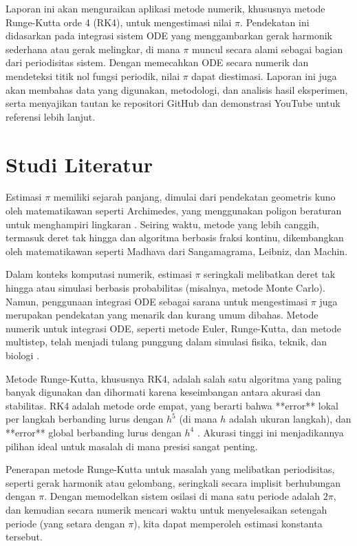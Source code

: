 \documentclass[conference]{IEEEtran}
\begin{document}
Laporan ini akan menguraikan aplikasi metode numerik, khususnya metode Runge-Kutta orde 4 (RK4), untuk mengestimasi nilai $\pi$. Pendekatan ini didasarkan pada integrasi sistem ODE yang menggambarkan gerak harmonik sederhana atau gerak melingkar, di mana $\pi$ muncul secara alami sebagai bagian dari periodisitas sistem. Dengan memecahkan ODE secara numerik dan mendeteksi titik nol fungsi periodik, nilai $\pi$ dapat diestimasi. Laporan ini juga akan membahas data yang digunakan, metodologi, dan analisis hasil eksperimen, serta menyajikan tautan ke repositori GitHub dan demonstrasi YouTube untuk referensi lebih lanjut.

\section{Studi Literatur}
Estimasi $\pi$ memiliki sejarah panjang, dimulai dari pendekatan geometris kuno oleh matematikawan seperti Archimedes, yang menggunakan poligon beraturan untuk menghampiri lingkaran \cite{b1}. Seiring waktu, metode yang lebih canggih, termasuk deret tak hingga dan algoritma berbasis fraksi kontinu, dikembangkan oleh matematikawan seperti Madhava dari Sangamagrama, Leibniz, dan Machin.

Dalam konteks komputasi numerik, estimasi $\pi$ seringkali melibatkan deret tak hingga atau simulasi berbasis probabilitas (misalnya, metode Monte Carlo). Namun, penggunaan integrasi ODE sebagai sarana untuk mengestimasi $\pi$ juga merupakan pendekatan yang menarik dan kurang umum dibahas. Metode numerik untuk integrasi ODE, seperti metode Euler, Runge-Kutta, dan metode multistep, telah menjadi tulang punggung dalam simulasi fisika, teknik, dan biologi \cite{b2}.

Metode Runge-Kutta, khususnya RK4, adalah salah satu algoritma yang paling banyak digunakan dan dihormati karena keseimbangan antara akurasi dan stabilitas. RK4 adalah metode orde empat, yang berarti bahwa **error** lokal per langkah berbanding lurus dengan $h^5$ (di mana $h$ adalah ukuran langkah), dan **error** global berbanding lurus dengan $h^4$ \cite{b3}. Akurasi tinggi ini menjadikannya pilihan ideal untuk masalah di mana presisi sangat penting.

Penerapan metode Runge-Kutta untuk masalah yang melibatkan periodisitas, seperti gerak harmonik atau gelombang, seringkali secara implisit berhubungan dengan $\pi$. Dengan memodelkan sistem osilasi di mana satu periode adalah $2\pi$, dan kemudian secara numerik mencari waktu untuk menyelesaikan setengah periode (yang setara dengan $\pi$), kita dapat memperoleh estimasi konstanta tersebut.
\end{document}
